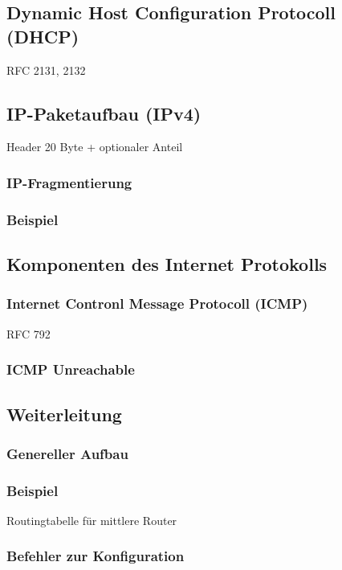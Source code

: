 \subsection{Dynamic Host Configuration Protocoll (DHCP)}
RFC 2131, 2132
\subsection{IP-Paketaufbau (IPv4)}
Header 20 Byte + optionaler Anteil
\subsubsection{IP-Fragmentierung}
\subsubsection*{Beispiel}

\subsection{Komponenten des Internet Protokolls}

\subsubsection{Internet Contronl Message Protocoll (ICMP)}
RFC 792
\subsubsection*{ICMP Unreachable}

\subsection{Weiterleitung}
\subsubsection*{Genereller Aufbau}
\subsubsection*{Beispiel}
Routingtabelle für mittlere Router
\subsubsection*{Befehler zur Konfiguration}
